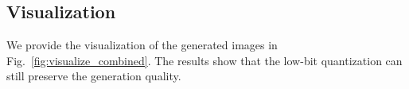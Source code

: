 % 


\subsection{Visualization}
We provide the visualization of the generated images in Fig.~\ref{fig:visualize_combined}. The results show that the low-bit quantization can still preserve the generation quality.

% 